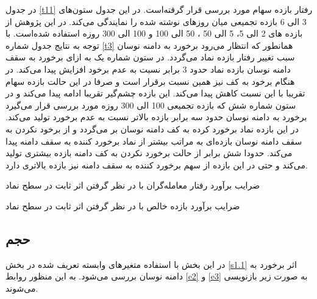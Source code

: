 \documentclass[12pt]{article}
\begin{document}
  در جدول 
  \ref{t11}
 رفتار بازده سهام مورد بررسی قرار گرفته‌است. در این جدول  
   ستون‌های 3 الی 6   بازده تجمیعی میان روز‌های نوشته شده را نمایندگی می‌کند. در این پژوهش از بازده های 2 الی 5، 5 الی 50 ، 50 الی 100 و 100 الی 300 روزه استفاده شده‌است. با توجه به نتایج جدول شماره 
   \ref{t3}
   همانطور که انتظار می‌رود برخورد به دامنه نوسان سبب تغییر رفتار بازده نماد می‌گردد. در ستون شماره یک به ازای برخورد به سقف دامنه نوسان بازده نماد حدود 3 برابر نسبت به عدم برخود افزایش پیدا می‌کند. در هنگام برخود به کف نیز همین نسبت برقرار است و صرفا در این حالت بازده سهام تقریبا با این نسبت کاهش پیدا می‌کند. این بازده چشم‌گیر تقریبا ادامه پیدا می‌کند و در ستون شماره شش که بازده تجمیعی 100 الی 300 روزه مورد بررسی قرار می‌گیرد برخورد به دامنه نوسان حدود سه برابر بازده بالا‌تر نسبت به عدم برخورد تولید می‌کند. در این بازده نماد برخورد کرده به کف دامنه نوسان بر می‌گردد و از برخود نکردن به سقف دامنه نوسان بازده‌ای به مراتب بیشتر از نماد برخورد کننده به سقف دامنه پیدا می‌کند. حدودا شش برابر از حالت برخورد نکردن به کف دامنه بازده بیشتری تولید می‌کند و حتی در این بازده از سهم برخورد کننده به سقف دامنه نیز بازده بالاتری دارد.
  

\begin{table}[htbp]
\centering
\begin{LTR}
\lr{}
\end{LTR}
\caption{ضرایب برآورد رفتار معامله‌گران با در نظر گرفتن اثر ثابت در سطح نماد}
\label{t3}
\end{table}

\begin{table}[htbp]
\centering
\begin{LTR}
\lr{}
\end{LTR}
\caption{ضرایب برآورد بازده خالص با در نظر گرفتن اثر ثابت در سطح نماد}
\label{t11}
\end{table}

\restoregeometry






\subsection{حجم}

در این بخش با استفاده متغیر‌های وابسته تعریف شده در بخش 
\ref{s1.1}
اثر برخورد به دامنه نوسان بررسی می‌شود. به این منظور روابط 
\ref{e2} 
و
\ref{e3}
به صورت زیر بازنویسی می‌شوند.
\end{document}
